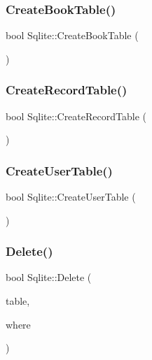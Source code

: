 \mbox{\label{class_sqlite_a2c8180569a048b3e69abd84a044caec6}} 
\subsubsection{\texorpdfstring{CreateBookTable()}{CreateBookTable()}}
{\footnotesize\ttfamily bool Sqlite\+::\+Create\+Book\+Table (\begin{DoxyParamCaption}{ }\end{DoxyParamCaption})}

\mbox{\label{class_sqlite_ae84aab901a62d1876dcfca3f190af12c}} 
\subsubsection{\texorpdfstring{CreateRecordTable()}{CreateRecordTable()}}
{\footnotesize\ttfamily bool Sqlite\+::\+Create\+Record\+Table (\begin{DoxyParamCaption}{ }\end{DoxyParamCaption})}

\mbox{\label{class_sqlite_aa0840501ef42abf7fff8efc064caae01}} 
\subsubsection{\texorpdfstring{CreateUserTable()}{CreateUserTable()}}
{\footnotesize\ttfamily bool Sqlite\+::\+Create\+User\+Table (\begin{DoxyParamCaption}{ }\end{DoxyParamCaption})}

\mbox{\label{class_sqlite_a772711beeceff7a567192e19abccfed4}} 
\subsubsection{\texorpdfstring{Delete()}{Delete()}}
{\footnotesize\ttfamily bool Sqlite\+::\+Delete (\begin{DoxyParamCaption}\item[{Q\+String}]{table,  }\item[{Q\+String}]{where }\end{DoxyParamCaption})}

